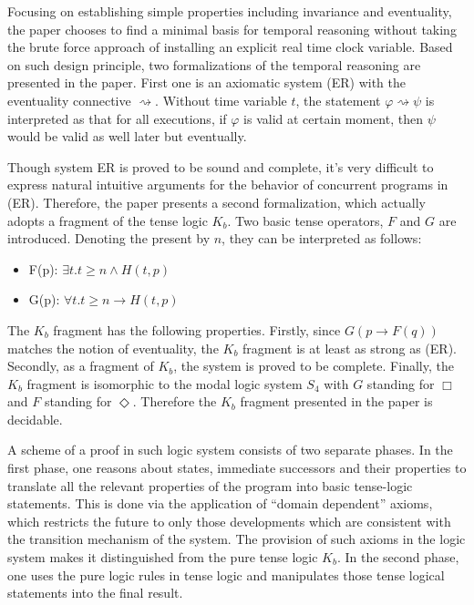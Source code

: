 \documentclass{llncs}
\begin{document}
Focusing on establishing simple properties including invariance and
eventuality, the paper chooses to find a minimal basis for temporal reasoning
without taking the brute force approach of installing an explicit real time
clock variable. Based on such design principle, two formalizations of the
temporal reasoning are presented in the paper. First one is an axiomatic
system (ER) with the eventuality connective $\rightsquigarrow$. 
Without time variable $t$,
the statement $\varphi \rightsquigarrow \psi$ is interpreted as that for all executions,
if $\varphi$ is valid at certain moment, then $\psi$ would be valid as well
later but eventually.

Though system ER is proved to be sound and complete, it’s very difficult to
express natural intuitive arguments for the behavior of concurrent programs in
(ER). Therefore, the paper presents a second formalization, which actually
adopts a fragment of the tense logic $K_b$. Two basic tense operators, $F$ and
$G$ are introduced. Denoting the present by $n$, they can be interpreted as
follows:
\begin{itemize}
\item
F(p): $\exists t. t \geq n \land H(t,p)$

\item
G(p): $\forall t. t \geq n \rightarrow H(t,p)$

\end{itemize}

The $K_b$ fragment has the following properties. Firstly, since
$G(p \rightarrow F(q))$ matches the notion of eventuality, 
the $K_b$ fragment is at least
as strong as (ER). Secondly, as a fragment of $K_b$, the system is proved to be
complete. Finally, the $K_b$ fragment is isomorphic to the modal logic system
$S_4$ with $G$ standing for $\Box$ and $F$ standing for $\Diamond$. Therefore the $K_b$
fragment presented in the paper is decidable.

A scheme of a proof in such logic system consists of two separate phases. In
the first phase, one reasons about states, immediate successors and their
properties to translate all the relevant properties of the program into
basic tense-logic statements. This is done via the application of “domain
dependent” axioms, which restricts the future to only those developments
which are consistent with the transition mechanism of the system. The
provision of such axioms in the logic system makes it distinguished from the pure
tense logic $K_b$. In the second phase, one uses the pure logic rules in tense
logic and manipulates those tense logical statements into the final result.
\end{document}

